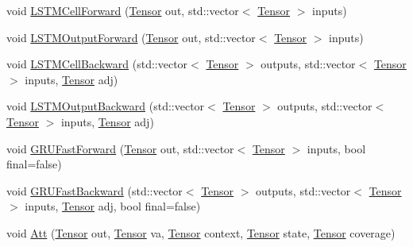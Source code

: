 \begin{DoxyCompactItemize}
\item 
void \hyperlink{namespacemarian_af0eb4b8f5cdcd9947c2974c7c6a12563}{L\+S\+T\+M\+Cell\+Forward} (\hyperlink{namespacemarian_a88b71ec34bb354564cddc24eb80f7e14}{Tensor} out, std\+::vector$<$ \hyperlink{namespacemarian_a88b71ec34bb354564cddc24eb80f7e14}{Tensor} $>$ inputs)
\item 
void \hyperlink{namespacemarian_a0b45c3ca238a4718908712266a40d4a1}{L\+S\+T\+M\+Output\+Forward} (\hyperlink{namespacemarian_a88b71ec34bb354564cddc24eb80f7e14}{Tensor} out, std\+::vector$<$ \hyperlink{namespacemarian_a88b71ec34bb354564cddc24eb80f7e14}{Tensor} $>$ inputs)
\item 
void \hyperlink{namespacemarian_a373ffb9ba8aae7bd12782b8bf10d005f}{L\+S\+T\+M\+Cell\+Backward} (std\+::vector$<$ \hyperlink{namespacemarian_a88b71ec34bb354564cddc24eb80f7e14}{Tensor} $>$ outputs, std\+::vector$<$ \hyperlink{namespacemarian_a88b71ec34bb354564cddc24eb80f7e14}{Tensor} $>$ inputs, \hyperlink{namespacemarian_a88b71ec34bb354564cddc24eb80f7e14}{Tensor} adj)
\item 
void \hyperlink{namespacemarian_a4d96e5240735c5a9f47277706dd36ab7}{L\+S\+T\+M\+Output\+Backward} (std\+::vector$<$ \hyperlink{namespacemarian_a88b71ec34bb354564cddc24eb80f7e14}{Tensor} $>$ outputs, std\+::vector$<$ \hyperlink{namespacemarian_a88b71ec34bb354564cddc24eb80f7e14}{Tensor} $>$ inputs, \hyperlink{namespacemarian_a88b71ec34bb354564cddc24eb80f7e14}{Tensor} adj)
\item 
void \hyperlink{namespacemarian_a7b5a0d3c521022a7428ded80cec80686}{G\+R\+U\+Fast\+Forward} (\hyperlink{namespacemarian_a88b71ec34bb354564cddc24eb80f7e14}{Tensor} out, std\+::vector$<$ \hyperlink{namespacemarian_a88b71ec34bb354564cddc24eb80f7e14}{Tensor} $>$ inputs, bool final=false)
\item 
void \hyperlink{namespacemarian_a62e537291759d564584ab5190e4c1629}{G\+R\+U\+Fast\+Backward} (std\+::vector$<$ \hyperlink{namespacemarian_a88b71ec34bb354564cddc24eb80f7e14}{Tensor} $>$ outputs, std\+::vector$<$ \hyperlink{namespacemarian_a88b71ec34bb354564cddc24eb80f7e14}{Tensor} $>$ inputs, \hyperlink{namespacemarian_a88b71ec34bb354564cddc24eb80f7e14}{Tensor} adj, bool final=false)
\item 
void \hyperlink{namespacemarian_acac7e44cebb8b07629f222a92850ed82}{Att} (\hyperlink{namespacemarian_a88b71ec34bb354564cddc24eb80f7e14}{Tensor} out, \hyperlink{namespacemarian_a88b71ec34bb354564cddc24eb80f7e14}{Tensor} va, \hyperlink{namespacemarian_a88b71ec34bb354564cddc24eb80f7e14}{Tensor} context, \hyperlink{namespacemarian_a88b71ec34bb354564cddc24eb80f7e14}{Tensor} state, \hyperlink{namespacemarian_a88b71ec34bb354564cddc24eb80f7e14}{Tensor} coverage)

\end{DoxyCompactItemize}
